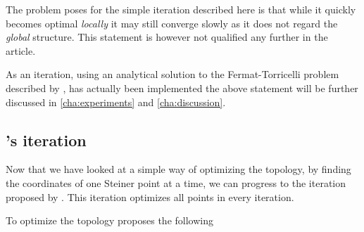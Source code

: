 The problem \citeauthor{smith1992} poses for the simple iteration described here is that while it
quickly becomes optimal \textit{locally} it may still converge slowly as it does not
regard the \textit{global} structure. This statement is however not qualified
any further in the article.

As an iteration, using an analytical solution to the Fermat-Torricelli problem
described by \textcite{uteshev2014}, has actually been implemented the above
statement will be further discussed in \cref{cha:experiments} and \cref{cha:discussion}.

\subsection{\citeauthor{smith1992}'s iteration}
\label{sec:smiths-iteration}

Now that we have looked at a simple way of optimizing the topology, by finding
the coordinates of one Steiner point at a time, we can progress to the iteration
proposed by \textcite{smith1992}. This iteration optimizes all points in every
iteration.

To optimize the topology \citeauthor{smith1992} proposes the following

